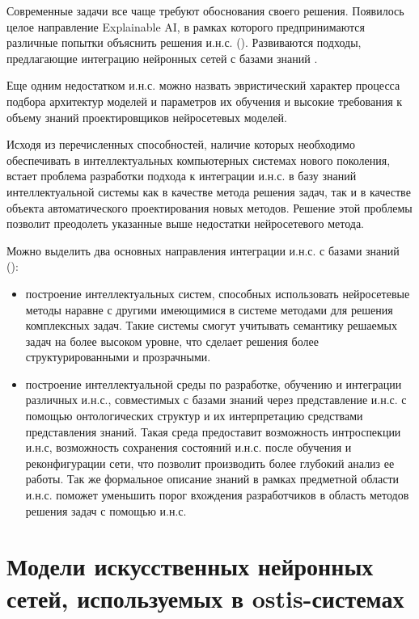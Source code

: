 Современные задачи все чаще требуют обоснования своего решения. Появилось целое направление Explainable AI, в рамках которого предпринимаются различные попытки объяснить решения и.н.с. (). Развиваются подходы, предлагающие интеграцию нейронных сетей с базами знаний .

Еще одним недостатком и.н.с. можно назвать эвристический характер процесса подбора архитектур моделей и параметров их обучения и высокие требования к объему знаний проектировщиков нейросетевых моделей.

Исходя из перечисленных способностей, наличие которых необходимо обеспечивать в интеллектуальных компьютерных системах нового поколения, встает проблема разработки подхода к интеграции и.н.с. в базу знаний интеллектуальной системы как в качестве метода решения задач, так и в качестве объекта автоматического проектирования новых методов. Решение этой проблемы позволит преодолеть указанные выше недостатки нейросетевого метода.

Можно выделить два основных направления интеграции и.н.с. с базами знаний ():
\begin{itemize}
	\item построение интеллектуальных систем, способных использовать нейросетевые методы наравне с другими имеющимися в системе методами для решения комплексных задач. Такие системы смогут учитывать семантику решаемых задач на более высоком уровне, что сделает решения более структурированными и прозрачными.
	\item построение интеллектуальной среды по разработке, обучению и интеграции различных и.н.с., совместимых с базами знаний через представление и.н.с. с помощью онтологических структур и их интерпретацию средствами представления знаний. Такая среда предоставит возможность интроспекции и.н.с, возможность сохранения состояний и.н.с. после обучения и реконфигурации сети, что позволит производить более глубокий анализ ее работы. Так же формальное описание знаний в рамках предметной области и.н.с. поможет уменьшить порог вхождения разработчиков в область методов решения задач с помощью и.н.с.
\end{itemize}


\section{Модели искусственных нейронных сетей, используемых в ostis-системах}
\label{sec_chapter_ann_models}

